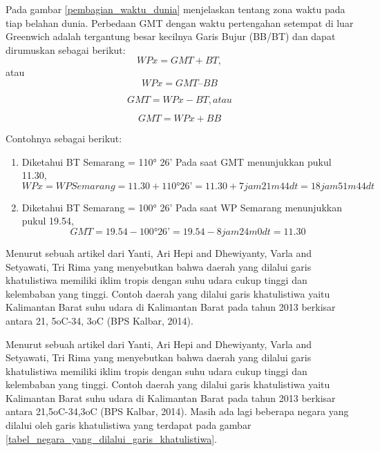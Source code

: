 Pada gambar \ref{pembagian_waktu_dunia} menjelaskan tentang zona waktu pada tiap belahan dunia. Perbedaan GMT dengan waktu pertengahan setempat di luar Greenwich adalah tergantung besar kecilnya Garis Bujur (BB/BT) dan dapat dirumuskan sebagai berikut\cite{khusurur2016mengenal}:
\begin{equation}
WP x = GMT + BT, 
\end{equation}
atau 
\begin{equation}
WP x = GMT – BB
\end{equation}

\begin{equation}
GMT = WP x - BT, 
atau
\end{equation}

\begin{equation}
GMT = WP x + BB
\end{equation}

Contohnya sebagai berikut:

\begin{enumerate}
\item
Diketahui BT Semarang = 110° 26’
Pada saat GMT menunjukkan pukul 11.30, 
\begin{equation}
WP x = WP Semarang = 11.30 + 110° 26’
= 11.30 + 7 jam 21m 44dt
= 18 jam 51 m 44 dt
\end{equation}

\item
Diketahui BT Semarang = 100° 26’
Pada saat WP Semarang menunjukkan pukul 19.54,
\begin{equation}
GMT = 19.54 - 100° 26’
    = 19.54 - 8 jam 24m 0dt
    = 11.30
\end{equation}
\end{enumerate}




	Menurut sebuah artikel dari Yanti, Ari Hepi and Dhewiyanty, Varla and Setyawati, Tri Rima yang menyebutkan bahwa daerah yang dilalui garis khatulistiwa 
memiliki iklim tropis dengan suhu udara cukup tinggi dan kelembaban yang tinggi. Contoh daerah yang dilalui garis khatulistiwa yaitu Kalimantan Barat
suhu udara di Kalimantan Barat pada tahun 2013 berkisar antara 21, 5oC-34, 3oC (BPS Kalbar, 2014). \cite {yanti2015prevalensi}


	Menurut sebuah artikel dari Yanti, Ari Hepi and Dhewiyanty, Varla and Setyawati, Tri Rima yang menyebutkan bahwa daerah yang dilalui garis khatulistiwa 
memiliki iklim tropis dengan suhu udara cukup tinggi dan kelembaban yang tinggi. Contoh daerah yang dilalui garis khatulistiwa yaitu Kalimantan Barat suhu udara di Kalimantan Barat pada tahun 2013 berkisar antara 21,5oC-34,3oC (BPS Kalbar, 2014)\cite{yanti2015prevalensi}. Masih ada lagi beberapa negara yang dilalui oleh garis khatulistiwa yang terdapat pada gambar \ref{tabel_negara_yang_dilalui_garis_khatulistiwa}.

